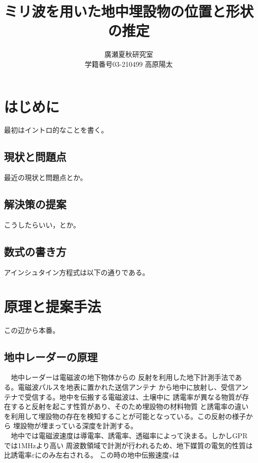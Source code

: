 \documentclass[a4paper,12pt]{jsreport}
\title{ミリ波を用いた地中埋設物の位置と形状の推定}
\author{廣瀬夏秋研究室\\
学籍番号03-210499 高原陽太}
\begin{document}
\maketitle
\tableofcontents

\chapter{はじめに}

最初はイントロ的なことを書く。
\section{現状と問題点}

最近の現状と問題点とか。

\section{解決策の提案}

こうしたらいい，とか。

\section{数式の書き方}

アインシュタイン方程式は以下の通りである。

\chapter{原理と提案手法}

この辺から本番。

\section{地中レーダーの原理}
　地中レーダーは電磁波の地下物体からの
反射を利用した地下計測手法である。電磁波パルスを地表に置かれた送信アンテナ
から地中に放射し、受信アンテナで受信する。地中を伝搬する電磁波は、土壌中に
誘電率が異なる物質が存在すると反射を起こす性質があり、そのため埋設物の材料物質
と誘電率の違いを利用して埋設物の存在を検知することが可能となっている。この反射の様子から
埋設物が埋まっている深度を計測する。
\\　地中では電磁波速度は導電率、誘電率、透磁率によって決まる。しかしGPRでは1MHzより高い
周波数領域で計測が行われるため、地下媒質の電気的性質は比誘電率$\varepsilon$にのみ左右される。
この時の地中伝搬速度$v$は
\end{document}

